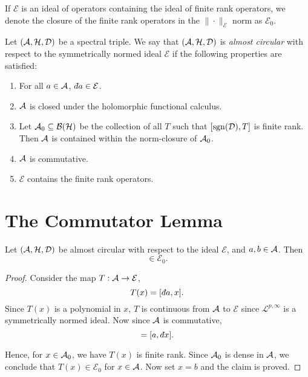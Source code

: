 \begin{definition}
    If $\mathcal{E}$ is an ideal of operators containing the ideal of finite rank
    operators, we denote the closure of the finite rank operators in the $\|\cdot\|_\mathcal{E}$
    norm as $\mathcal{E}_0$.
\end{definition}

\begin{definition}
    Let $(\mathcal{A},\mathcal{H},\mathcal{D})$ be a spectral triple. We say that $(\mathcal{A},\mathcal{H},\mathcal{D})$
    is \emph{almost circular} with respect
    to the symmetrically normed ideal $\mathcal{E}$
     if the following properties are satisfied:
    \begin{enumerate}
        \item{} For all $a \in \mathcal{A}$, $\qd a \in \mathcal{E}$.
        \item{} $\mathcal{A}$ is closed under the holomorphic functional calculus.
        \item{} Let $\mathcal{A}_0 \subseteq \mathcal{B}(\mathcal{H})$ be the collection of all
        $T$ such that $[\operatorname{sgn}(\mathcal{D}),T]$ is finite rank. Then $\mathcal{A}$ is contained
        within the norm-closure of $\mathcal{A}_0$.
        \item{} $\mathcal{A}$ is commutative.
        \item{} $\mathcal{E}$ contains the finite rank operators.
    \end{enumerate}
\end{definition}


\section{The Commutator Lemma}
\begin{lemma}
\label{commutator}
    Let $(\mathcal{A},\mathcal{H},\mathcal{D})$ be almost circular with respect to the ideal $\mathcal{E}$, and $a,b \in \mathcal{A}$. Then
    \begin{equation*}
        [\qd a,b] \in \mathcal{E}_0.
    \end{equation*}
\end{lemma}
\begin{proof}
    Consider the map $T:\mathcal{A}\to\mathcal{E}$,
    \begin{equation*}
        T(x) = [\qd a,x].
    \end{equation*}
    Since $T(x)$
    is a polynomial in $x$, $T$ is continuous from $\mathcal{A}$ to $\mathcal{E}$
    since $\mathcal{L}^{p,\infty}$ is a symmetrically normed ideal. Now since
    $\mathcal{A}$ is commutative,
    \begin{equation*}
        [\qd a,x] = [a,\qd x].
    \end{equation*}
    
    Hence, for $x \in \mathcal{A}_0$, we have $T(x)$ is finite rank. Since $\mathcal{A}_0$
    is dense in $\mathcal{A}$, we conclude that $T(x) \in \mathcal{E}_0$
    for $x \in \mathcal{A}$. Now set $x = b$ and the claim is proved.
\end{proof}

